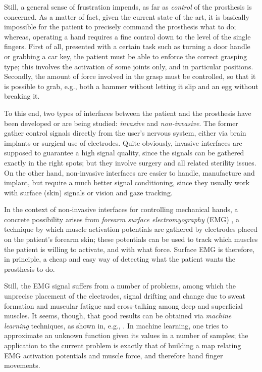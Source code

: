 Still, a general sense of frustration impends, as far as
\emph{control} of the prosthesis is concerned. As a matter of fact,
given the current state of the art, it is basically impossible for the
patient to precisely command the prosthesis what to do; whereas,
operating a hand requires a fine control down to the level of the
single fingers. First of all, presented with a certain task such as
turning a door handle or grabbing a car key, the patient must be able
to enforce the correct grasping type; this involves the activation of
some joints only, and in particular positions. Secondly, the amount of
force involved in the grasp must be controlled, so that it is possible
to grab, e.g., both a hammer without letting it slip and an egg
without breaking it.

To this end, two types of interfaces between the patient and the
prosthesis have been developed or are being studied: \emph{invasive}
and \emph{non-invasive}. The former gather control signals directly
from the user's nervous system, either via brain implants or surgical
use of electrodes. Quite obviously, invasive interfaces are supposed
to guarantee a high signal quality, since the signals can be gathered
exactly in the right spots; but they involve surgery and all related
sterility issues. On the other hand, non-invasive interfaces are
easier to handle, manufacture and implant, but require a much better
signal conditioning, since they usually work with surface (skin)
signals or vision and gaze tracking.

In the context of non-invasive interfaces for controlling mechanical
hands, a concrete possibility arises from \emph{forearm surface
electromyography} (EMG) \cite{zecca}, a technique by which muscle
activation potentials are gathered by electrodes placed on the
patient's forearm skin; these potentials can be used to track which
muscles the patient is willing to activate, and with what force.
Surface EMG is therefore, in principle, a cheap and easy way of
detecting what the patient wants the prosthesis to do.

Still, the EMG signal suffers from a number of problems, among which
the unprecise placement of the electrodes, signal drifting and change
due to sweat formation and muscular fatigue and cross-talking among
deep and superficial muscles. It seems, though, that good results can
be obtained via \emph{machine learning} techniques, as shown in, e.g.,
\cite{smagt}. In machine learning, one tries to approximate an unknown
function given its values in a number of samples; the application to
the current problem is exactly that of building a map relating EMG
activation potentials and muscle force, and therefore hand finger
movements.

